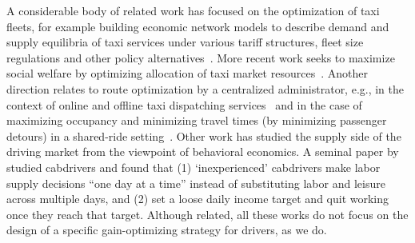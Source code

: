 A considerable body of related work has focused on the optimization of taxi fleets, for
example building economic network models to describe demand and supply equilibria of taxi 
services under various tariff structures, fleet size regulations and other policy
alternatives~\cite{bailey1987simulation,yang2002demand}.  More recent work seeks to 
maximize social welfare by optimizing allocation of taxi market resources~\cite{shi2016optimization}.
Another direction relates to route optimization by a centralized administrator, e.g., in
the context of online and offline taxi dispatching services~\cite{maciejewski2013simulation,nunes2011taxi} 
and in the case of maximizing occupancy and minimizing travel times (by minimizing passenger detours) 
in a shared-ride setting~\cite{jung2013design}.
Other work has studied the supply side of the driving market from the viewpoint of behavioral economics.
A seminal paper by ~\cite{camerer1997labor} studied cabdrivers and found that  (1) `inexperienced' 
cabdrivers make labor supply decisions ``one day at a time'' instead of substituting labor and leisure 
across multiple days, and  (2) set a loose daily income target and quit working once they reach that 
target.  
Although related, all these works do not focus on the design of a specific gain-optimizing
strategy for drivers, as we do.

